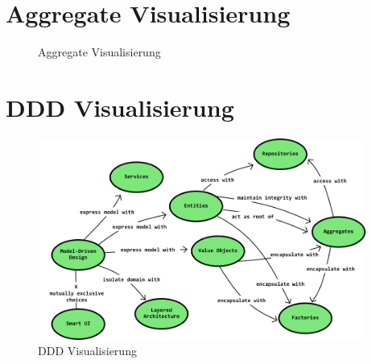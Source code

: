 %	
%

\section{Aggregate Visualisierung} \label{a.1.aggregate}
	\begin{figure}[h]
		\centering
		\caption{Aggregate Visualisierung \cite{domainModell.microsoft}}
		\label{a.1.aggregate}
	\end{figure}

\newpage

\section{\acl{DDD} Visualisierung} \label{a.1.ddd}
	\begin{figure}[h]
		\centering
		\includegraphics[height=250px]{./zfiles/Bilder/ddd.png}
		\caption{\acl{DDD} Visualisierung \cite{ddd.stemmler}}
		\label{a.1.ddd}
	\end{figure}

\newpage
